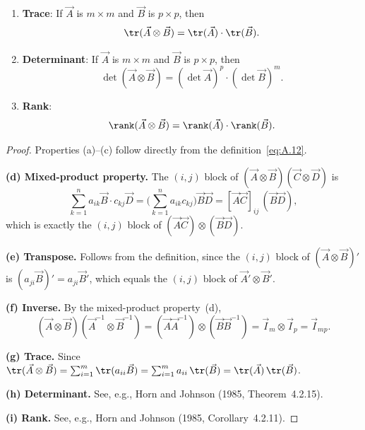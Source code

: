 \begin{proposition}
\begin{enumerate}[label=(\alph*)]
  \item \textbf{Trace}: If $\vec{A}$ is $m \times m$ and $\vec{B}$ is
    $p \times p$, then
    \begin{equation}
      \tr(\vec{A} \otimes \vec{B})
      = \tr(\vec{A}) \cdot \tr(\vec{B}).
      \label{eq:A.20}
    \end{equation}

  \item \textbf{Determinant}: If $\vec{A}$ is $m \times m$ and
    $\vec{B}$ is $p \times p$, then
    \begin{equation}
      \det(\vec{A} \otimes \vec{B})
      = (\det \vec{A})^{p} \cdot (\det \vec{B})^{m}.
      \label{eq:A.21}
    \end{equation}

  \item \textbf{Rank}:
    \begin{equation}
      \rank(\vec{A} \otimes \vec{B})
      = \rank(\vec{A}) \cdot \rank(\vec{B}).
      \label{eq:A.22}
    \end{equation}
\end{enumerate}
\end{proposition}

\begin{proof}
Properties (a)--(c) follow directly from the definition~\eqref{eq:A.12}.

\medskip
\noindent\textbf{(d) Mixed-product property.}\quad
The $(i,j)$ block of $(\vec{A} \otimes \vec{B})(\vec{C} \otimes \vec{D})$
is
\[
  \sum_{k=1}^{n} a_{ik}\vec{B} \cdot c_{kj}\vec{D}
  = \biggl(\sum_{k=1}^{n} a_{ik}c_{kj}\biggr) \vec{B}\vec{D}
  = [\vec{A}\vec{C}]_{ij}\,(\vec{B}\vec{D}),
\]
which is exactly the $(i,j)$ block of
$(\vec{A}\vec{C}) \otimes (\vec{B}\vec{D})$.

\medskip
\noindent\textbf{(e) Transpose.}\quad
Follows from the definition, since the $(i,j)$ block of
$(\vec{A} \otimes \vec{B})'$ is $(a_{ji}\vec{B})' = a_{ji}\vec{B}'$,
which equals the $(i,j)$ block of $\vec{A}' \otimes \vec{B}'$.

\medskip
\noindent\textbf{(f) Inverse.}\quad
By the mixed-product property~(d),
\[
  (\vec{A} \otimes \vec{B})(\vec{A}^{-1} \otimes \vec{B}^{-1})
  = (\vec{A}\vec{A}^{-1}) \otimes (\vec{B}\vec{B}^{-1})
  = \vec{I}_m \otimes \vec{I}_p
  = \vec{I}_{mp}.
\]

\medskip
\noindent\textbf{(g) Trace.}\quad
Since $\tr(\vec{A} \otimes \vec{B})
= \sum_{i=1}^{m} \tr(a_{ii}\vec{B})
= \sum_{i=1}^{m} a_{ii}\,\tr(\vec{B})
= \tr(\vec{A})\,\tr(\vec{B})$.

\medskip
\noindent\textbf{(h) Determinant.}\quad
See, e.g., Horn and Johnson (1985, Theorem~4.2.15).

\medskip
\noindent\textbf{(i) Rank.}\quad
See, e.g., Horn and Johnson (1985, Corollary~4.2.11).
\end{proof}

